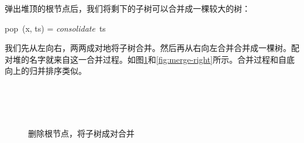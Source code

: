 \documentclass[b5paper]{ctexart}
\begin{document}
弹出堆顶的根节点后，我们将剩下的子树可以合并成一棵较大的树：

\be
pop\ (x, ts) = \textit{consolidate}\ ts
\ee

我们先从左向右，两两成对地将子树合并。然后再从右向左合并合并成一棵树。配对堆的名字就来自这一合并过程。如图\ref{fig:merge-pairs}和\ref{fig:merge-right}所示。合并过程和自底向上的归并排序\cite{okasaki-book}类似。

\begin{figure}[htbp]
  \centering
   \\
   \\
   \\
  \caption{删除根节点，将子树成对合并} \label{fig:merge-pairs}
\end{figure}
\end{document}

